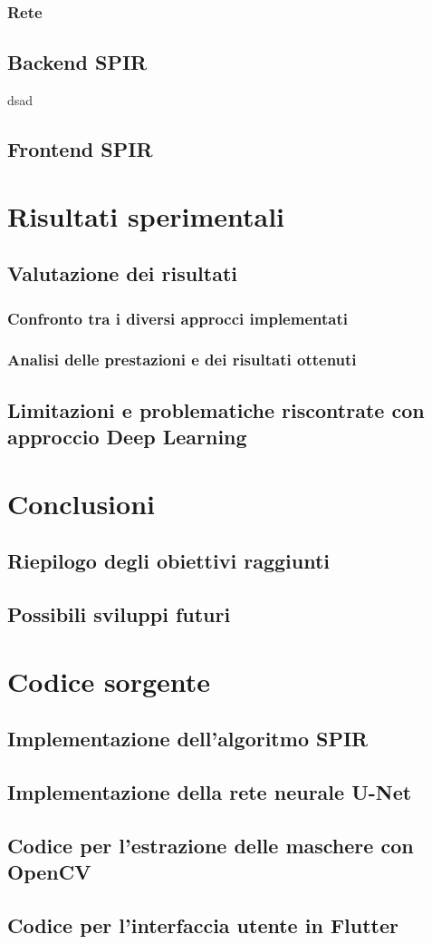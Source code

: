 \documentclass[a4paper,12pt]{report}
\begin{document}
      \subsection{Rete}
    \section{Backend SPIR}
    dsad
    \section{Frontend SPIR}

\chapter{Risultati sperimentali}
  \section{Valutazione dei risultati}
    \subsection{Confronto tra i diversi approcci implementati}
    \subsection{Analisi delle prestazioni e dei risultati ottenuti}
  \section{Limitazioni e problematiche riscontrate con approccio Deep Learning}

\chapter{Conclusioni}
  \section{Riepilogo degli obiettivi raggiunti}
  \section{Possibili sviluppi futuri}

\chapter{Codice sorgente}
  \section{Implementazione dell'algoritmo SPIR}
  \section{Implementazione della rete neurale U-Net}
  \section{Codice per l'estrazione delle maschere con OpenCV}
  \section{Codice per l'interfaccia utente in Flutter}

  
  
\end{document}
